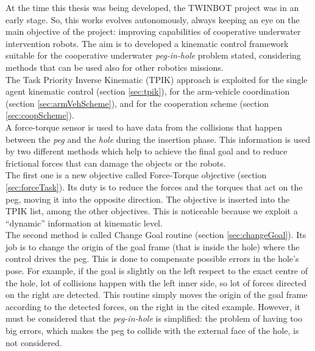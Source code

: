 At the time this thesis was being developed, the TWINBOT project was in an early stage. So, this works evolves autonomously, always keeping an eye on the main objective of the project: improving capabilities of cooperative underwater intervention robots. The aim  is to developed a kinematic control framework suitable for the cooperative underwater \textit{peg-in-hole} problem stated, considering methods that can be used also for other robotics missions.\\
The Task Priority Inverse Kinematic (TPIK) approach is exploited for the single agent kinematic control (section \ref{sec:tpik}), for the arm-vehicle coordination (section \ref{sec:armVehScheme}), and for the cooperation scheme (section \ref{sec:coopScheme}).\\
A force-torque sensor is used to have data from the collisions that happen between the \textit{peg} and the \textit{hole} during the insertion phase. This information is used by two different methods which help to achieve the final goal and to reduce frictional forces that can damage the objects or the robots.\\
The first one is a new objective called Force-Torque objective (section \ref{sec:forceTask}). Its duty is to reduce the forces and the torques that act on the peg, moving it into the opposite direction. The objective is inserted into the TPIK list, among the other objectives. This is noticeable because we exploit a \enquote{dynamic} information at kinematic level.\\
The second method is called Change Goal routine (section \ref{sec:changeGoal}). Its job is to change the origin of the goal frame (that is inside the hole) where the control drives the peg. This is done to compensate possible errors in the hole's pose. For example, if the goal is slightly on the left respect to the exact centre of the hole, lot of collisions happen with the left inner side, so lot of forces directed on the right are detected. This routine simply moves the origin of the goal frame according to the detected forces, on the right in the cited example. 
However, it must be considered that the \textit{peg-in-hole} is simplified: the problem of having too big errors, which makes the peg to collide with the external face of the hole, is not considered.

